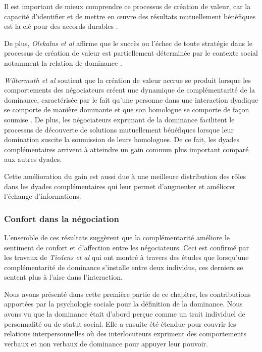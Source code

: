 		Il est important de mieux comprendre ce processus de création de valeur, car la capacité d'identifier et de mettre en œuvre des résultats mutuellement bénéfiques est la clé pour des accords durables \cite{wiltermuth2015benefits}.
		
		De plus, \emph{Olekalns et al} affirme que le succès ou l'échec de toute stratégie dans le processus de création de valeur est partiellement déterminée par le contexte social notamment la relation de dominance \cite{olekalns2013dyadic}.
		
		\emph{Wiltermuth et al} soutient que la création de valeur accrue se produit lorsque les comportements des négociateurs créent une dynamique de complémentarité de la dominance, caractérisée par le fait qu'une personne dans une interaction dyadique se comporte de manière dominante et que son homologue se comporte de façon soumise \cite{wiltermuth2015benefits}. De plus, les négociateurs exprimant de la dominance facilitent le processus de découverte de solutions mutuellement bénéfiques lorsque leur domination suscite la soumission de leurs homologues. De ce fait, les dyades complémentaires arrivent à atteindre un gain commun plus important comparé aux autres dyades.
		
		Cette amélioration du gain est aussi due à une meilleure distribution des rôles dans les dyades complémentaires qui leur permet d'augmenter et améliorer l'échange d'informations. 
		
		\subsubsection*{Confort dans la négociation}
		
		L'ensemble de ces résultats suggèrent que la complémentarité améliore le sentiment de confort et d'affection entre les négociateurs. Ceci est confirmé par les travaux de \emph{Tiedens et al} \cite{tiedens2003power} qui ont montré à travers des études que lorsqu'une complémentarité de dominance s'installe entre deux individus, ces derniers se sentent plus à l'aise dans l'interaction. 
		
		Nous avons présenté dans cette première partie de ce chapitre, les contributions apportées par la psychologie sociale pour la définition de la dominance. Nous avons vu que la dominance était d'abord perçue comme un trait individuel de personnalité ou de statut social. Elle a ensuite été étendue pour couvrir les relations interpersonnelles où des interlocuteurs expriment des comportements verbaux et non verbaux de dominance pour appuyer leur pouvoir. 
		
